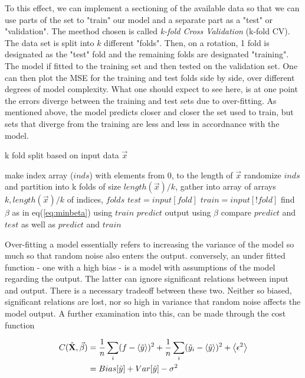 \documentclass[ 12pt, a4paper ]{article}
\begin{document}
To this effect, we can implement a sectioning of the available data so that we can use parts of
the set to "train" our model and a separate part as a "test" or "validation".
The meethod chosen is called \textit{k-fold Cross Validation} (k-fold CV).
The data set is split into $k$ different "folds". Then, on a rotation, 1 fold is designated as
the "test" fold and the remaining folds are designated "training". The model if fitted to the 
training set and then tested on the validation set. One can then plot the MSE for the training 
and test folds side by side, over different degrees of model complexity. What one should expect
to see here, is at one point the errors diverge between the training and test sets due to 
over-fitting. As mentioned above, the model predicts closer and closer the set used to train, 
but sets that diverge from the training are less and less in accordnance with the model.
\begin{algorithm}
\caption{k fold split based on input data $\vec{x}$ }
\begin{algorithmic}
\STATE  make index array ($inds$) with elements from $0$, to the length of $\vec{x}$
\STATE  randomize $inds$ and partition into k folds of size $length(\vec{x})/k$, 
\STATE  gather into array of arrays $k, length(\vec{x})/k$ of indices, $folds$
\STATE  $test = input[fold]$
\STATE  $train = input[!fold]$
\STATE  find $\beta$ as in eq(\ref{eq:minbeta}) using $train$
\STATE  $predict$ output using $\beta$
\STATE  compare $predict$ and $test$ as well as $predict$ and $train$
\ENDFOR
\end{algorithmic}
\end{algorithm}

Over-fitting a model essentially refers to increasing the variance of the model so much so
that random noise also enters the output. conversely, an under fitted function - one with a high
bias - is a model with assumptions of the model regarding the output. The latter can ignore
significant relations between input and output. There is a necessary tradeoff between these 
two. Neither so biased, significant relations are lost, nor so high in variance that random 
noise affects the model output. A further examination into this, can be made through the cost 
function

\begin{align}
    C(\hat{\mathbf{X}}, \vec{\beta} ) 
   & = \frac{1}{n} \sum_i (f - \ev{\tilde{y}})^2
    + \frac{1}{n} \sum_i (\tilde{y}_i - \ev{\tilde{y}})^2 + \ev{\epsilon^2} \nonumber \\
   & = Bias[\tilde{y}] + Var[\tilde{y}] - \sigma^2
\end{align}
\end{document}
